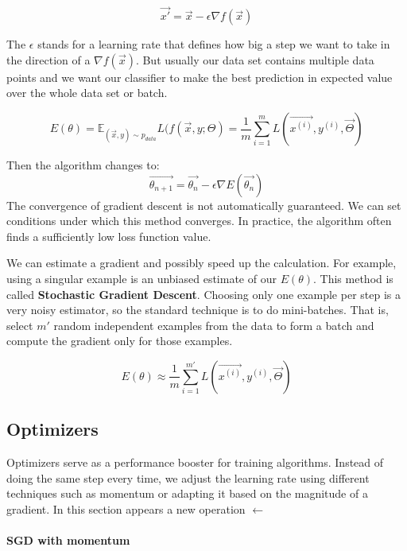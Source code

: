 \begin{equation}
    \label{vanila gradient descent}
    \Vec{x'} = \Vec{x} - \epsilon \nabla f(\Vec{x})
\end{equation}

The $\epsilon$ stands for a learning rate that defines how big a step we want to take in the direction of a $\nabla f(\Vec{x})$. But usually our data set contains multiple data points and we want our classifier to make the best prediction in expected value over the whole data set or batch. 

\begin{equation}
    \label{BGD}
   E(\theta) = \mathbb{E}_{(\Vec{x}, y) \sim p_{data}} L(f(\Vec{x}, y;\Theta ) = \frac{1}{m} \sum_{i=1}^m L ( \Vec{x^{(i)}}, y^{(i)},  \Vec{\Theta} )
\end{equation}

Then the algorithm changes to:
$$
\Vec{\theta_{n+1}} = \Vec{\theta_{n}} - \epsilon \nabla E(\Vec{\theta_{n}})
$$
The convergence of gradient descent is not automatically guaranteed. We can set conditions under which this method converges.  In practice, the algorithm often finds a sufficiently low loss function value. 
\par We can estimate a gradient and possibly speed up the calculation. For example, using a singular example is an unbiased estimate of our $E(\theta)$. This method is called \textbf{Stochastic Gradient Descent}. Choosing only one example per step is a very noisy estimator, so the standard technique is to do mini-batches. That is, select $m'$ random independent examples from the data to form a batch and compute the gradient only for those examples. 

\begin{equation}
    \label{SGD}
   E(\theta) \approx \frac{1}{m} \sum_{i=1}^{m'} L ( \Vec{x^{(i)}}, y^{(i)},  \Vec{\Theta} ) 
\end{equation}

\subsection{Optimizers}
Optimizers serve as a performance booster for training algorithms. Instead of doing the same step every time, we adjust the learning rate using different techniques such as momentum or adapting it based on the magnitude of a gradient. In this section appears a new operation $\xleftarrow{}$

\paragraph{SGD with momentum}
